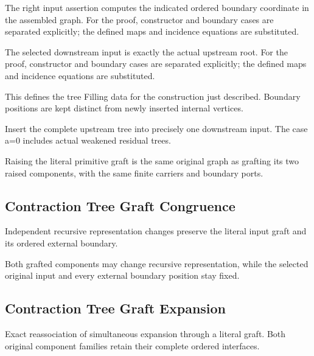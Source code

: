 The right input assertion computes the indicated ordered boundary coordinate in the assembled graph.
For the proof, constructor and boundary cases are separated explicitly; the defined maps and incidence equations are substituted.
\par{}

The selected downstream input is exactly the actual upstream root.
For the proof, constructor and boundary cases are separated explicitly; the defined maps and incidence equations are substituted.
\par{}

This defines the tree Filling data for the construction just described. Boundary positions are kept distinct from newly inserted internal vertices.
\par{}

Insert the complete upstream tree into precisely one downstream input. The case a=0 includes actual weakened residual trees.
\par{}

Raising the literal primitive graft is the same original graph as grafting its two raised components, with the same finite carriers and boundary ports.
\par{}

\subsection{Contraction Tree Graft Congruence}
Independent recursive representation changes preserve the literal input graft and its ordered external boundary.

Both grafted components may change recursive representation, while the selected original input and every external boundary position stay fixed.
\par{}

\subsection{Contraction Tree Graft Expansion}
Exact reassociation of simultaneous expansion through a literal graft. Both original component families retain their complete ordered interfaces.

